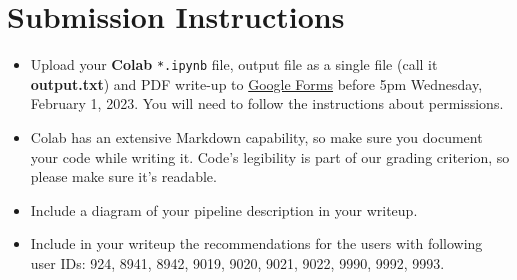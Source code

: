 \documentclass[paper=a4, fontsize=11pt]{scrartcl} %
\begin{document}
\section{Submission Instructions}

\begin{itemize}
    \item Upload your \textbf{Colab} \verb"*.ipynb" file, output file as a single file (call it \textbf{output.txt}) and PDF write-up to \href{https://forms.gle/TNcLEAAYRk62nqNZA}{Google Forms} before 5pm Wednesday, February 1, 2023. You will need to follow the instructions about permissions.
    \item Colab has an extensive Markdown capability, so make sure you document your code while writing it. Code’s legibility is part of our grading criterion, so please make sure it’s readable.
    \item Include a diagram of your pipeline description in your writeup.
    \item Include in your writeup the recommendations for the users with following user IDs: 924, 8941, 8942, 9019, 9020, 9021, 9022, 9990, 9992, 9993.
\end{itemize}
\end{document}
